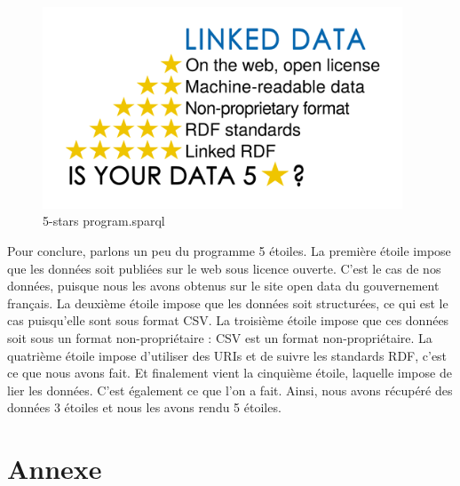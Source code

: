 \documentclass[a4paper,sffamily,12pt]{article}
\begin{document}
		\begin{figure}[!h]
			
			\centerline{\includegraphics[height=6cm]{picture/linked_data.png}}
			\caption{5-stars program.sparql}
			\label{5stars}
			
		\end{figure}		
	
		\vspace{1cm}
		
		Pour conclure, parlons un peu du programme 5 étoiles. La première étoile impose que les données soit publiées sur le web sous licence ouverte. C'est le cas de nos données, puisque nous les avons obtenus sur le site open data du gouvernement français. La deuxième étoile impose que les données soit structurées, ce qui est le cas puisqu'elle sont sous format CSV. La troisième étoile impose que ces données soit sous un format non-propriétaire : CSV est un format non-propriétaire. La quatrième étoile impose d'utiliser des URIs et de suivre les standards RDF, c'est ce que nous avons fait. Et finalement vient la cinquième étoile, laquelle impose de lier les données. C'est également ce que l'on a fait. Ainsi, nous avons récupéré des données 3 étoiles et nous les avons rendu 5 étoiles.

		\newpage			
		
	\section{Annexe}

		\vspace{0.5cm}
		
\end{document}
